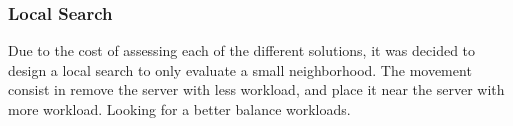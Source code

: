\subsubsection{Local Search}
Due to the cost of assessing each of the different solutions,
it was decided to design a local search
to only evaluate a small neighborhood.
The movement consist in
remove the server with less workload,
and place it near the server with more workload.
Looking for a better balance
workloads.
